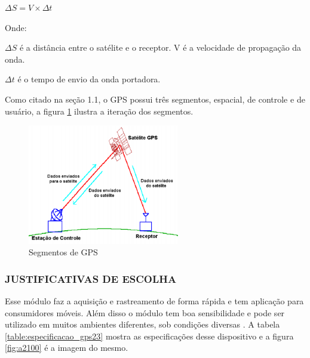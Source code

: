  $ \Delta S = V \times  \Delta t $

 Onde:

 $ \Delta S $ é a distância entre o satélite e o receptor.
V é a velocidade de propagação da onda.

$ \Delta t $ é o tempo de envio da onda portadora.

Como citado na seção 1.1, o GPS possui três segmentos, espacial, de controle e
de usuário, a figura \ref{fig:segmentos_gps} ilustra a iteração dos segmentos.


\begin{figure}[h]
  \centering
  \includegraphics[width=250px, scale=1]{figuras/segmentos_gps}
  \caption{Segmentos de GPS  \cite{9gps}}
\label{fig:segmentos_gps}
\end{figure}


\subsubsection{JUSTIFICATIVAS DE ESCOLHA}

Esse módulo faz a aquisição e rastreamento de forma rápida e tem aplicação
 para consumidores móveis. Além disso o módulo tem boa sensibilidade e pode
 ser utilizado em muitos ambientes diferentes, sob condições diversas \cite{10gps}.
 A tabela \ref{table:especificacao_gps23} mostra as especificações desse dispositivo e a figura \ref{fig:a2100} é a
 imagem do mesmo.


